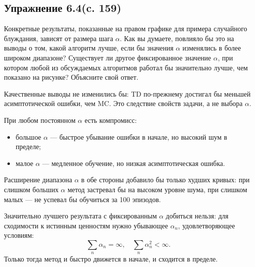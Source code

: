 \subsection{Упражнение 6.4(c. 159)}
Конкретные результаты, показанные на правом графике для примера случайного блуждания, зависят от размера шага $\alpha$. Как вы думаете, повлияло бы это на выводы о том, какой алгоритм лучше, если бы значения $\alpha$ изменялись в более широком диапазоне? Существует ли другое фиксированное значение $\alpha$, при котором любой из обсуждаемых алгоритмов работал бы значительно лучше, чем показано на рисунке? Объясните свой ответ.
\begin{solution}
    Качественные выводы не изменились бы: TD по-прежнему достигал бы меньшей асимптотической ошибки, чем MC. Это следствие свойств задачи, а не выбора $\alpha$.

    При любом постоянном $\alpha$ есть компромисс:
    \begin{itemize}
        \item большое $\alpha$ — быстрое убывание ошибки в начале, но высокий шум в пределе;
        \item малое $\alpha$ — медленное обучение, но низкая асимптотическая ошибка.
    \end{itemize}
    Расширение диапазона $\alpha$ в обе стороны добавило бы только худших кривых: при слишком больших $\alpha$ метод застревал бы на высоком уровне шума, при слишком малых — не успевал бы обучиться за 100 эпизодов.

    Значительно лучшего результата с фиксированным $\alpha$ добиться нельзя: для сходимости к истинным ценностям нужно убывающее $\alpha_n$, удовлетворяющее условиям:
    \[
    \sum_n \alpha_n = \infty, \quad \sum_n \alpha_n^2 < \infty.
    \]
    Только тогда метод и быстро движется в начале, и сходится в пределе.
\end{solution}

